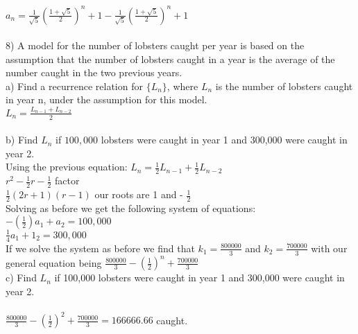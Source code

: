 \documentclass{article}
\begin{document}
\begin{flushleft}
$a_n = \frac{1}{\sqrt{5}}(\frac{1+\sqrt{5}}{2})^n+1 - \frac{1}{\sqrt{5}}(\frac{1+\sqrt{5}}{2})^n+1$ \\
~\\
\setlength\parindent{0pt}8) A model for the number of lobsters caught per year is based on the assumption that the number of lobsters caught in a year is the average of the number caught in the two previous years. \\
a) Find a recurrence relation for $\{ L_n \}$, where $L_n$ is the number of lobsters caught in year n, under the assumption for this model.  \\
$L_n = \frac{L_{n-1} + L_{n-2}}{2}$ \\
~\\
b) Find $L_n$ if $100,000$ lobsters were caught in year 1 and 300,000 were caught in year 2. \\
Using the previous equation: $L_n = \frac{1}{2}L_{n-1} + \frac{1}{2}L_{n-2}$ \\
$r^2 -\frac{1}{2}r - \frac{1}{2}$ factor \\
$\frac{1}{2} (2r+1)(r-1)$ our roots are 1 and - $\frac{1}{2}$\\
Solving as before we get the following system of equations: \\
$-(\frac{1}{2})a_1 + a_2 = 100,000$ \\
$\frac{1}{4} a_1 + 1_2  = 300,000$ \\
If we solve the system as before we find that $k_1 = \frac{800000}{3}$ and $k_2 = \frac{700000}{3}$ with our general equation being $\frac{800000}{3}-(\frac{1}{2})^n + \frac{700000}{3}$\\
c) Find $L_n$ if 100,000 lobsters were caught in year 1 and 300,000 were caught in year 2. \\
~\\
$\frac{800000}{3}-(\frac{1}{2})^2 + \frac{700000}{3} = 166666.66 $ caught.

\end{flushleft}
\end{document}

